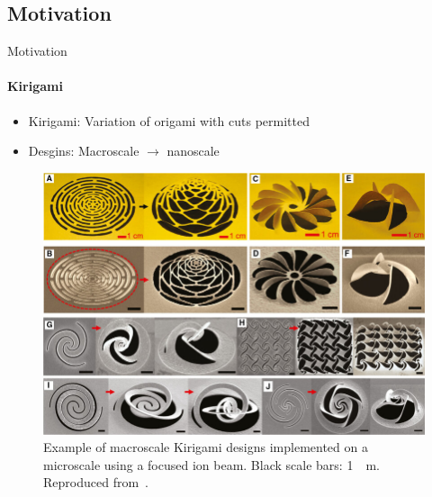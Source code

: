 \documentclass[
	10pt, %
]{beamer}
\begin{document}
\subsection{Motivation}
\begin{frame}{Motivation}
	\framesubtitle{Kirigami}
	\begin{itemize}
		\item Kirigami: Variation of origami with cuts permitted
		\item Desgins: Macroscale $\to$ nanoscale
	\end{itemize}

	\begin{figure}
		\includegraphics[height=0.55\textheight]{figures/kirigami_example.jpg}
		\caption{Example of macroscale Kirigami designs implemented on a microscale using a focused ion beam. Black scale bars: \SI{1}{\mu m}. Reproduced from~\cite{Li_2018}.}
	\end{figure}	
\end{frame}
%
%
\end{document}
